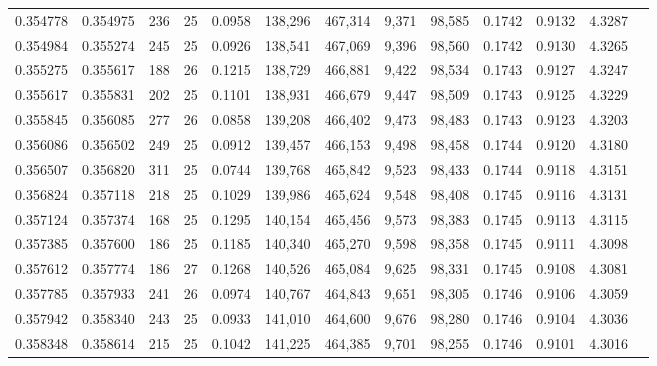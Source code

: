 \begin{tabular}{rrrrrrrrrrrrr}
0.354778 & 0.354975 & 236 &  25 &                                     0.0958 & 138,296 & 467,314 &   9,371 &  98,585 & 0.1742 & 0.9132 & 4.3287 \\
0.354984 & 0.355274 & 245 &  25 &                                     0.0926 & 138,541 & 467,069 &   9,396 &  98,560 & 0.1742 & 0.9130 & 4.3265 \\
0.355275 & 0.355617 & 188 &  26 &                                     0.1215 & 138,729 & 466,881 &   9,422 &  98,534 & 0.1743 & 0.9127 & 4.3247 \\
0.355617 & 0.355831 & 202 &  25 &                                     0.1101 & 138,931 & 466,679 &   9,447 &  98,509 & 0.1743 & 0.9125 & 4.3229 \\
0.355845 & 0.356085 & 277 &  26 &                                     0.0858 & 139,208 & 466,402 &   9,473 &  98,483 & 0.1743 & 0.9123 & 4.3203 \\
0.356086 & 0.356502 & 249 &  25 &                                     0.0912 & 139,457 & 466,153 &   9,498 &  98,458 & 0.1744 & 0.9120 & 4.3180 \\
0.356507 & 0.356820 & 311 &  25 &                                     0.0744 & 139,768 & 465,842 &   9,523 &  98,433 & 0.1744 & 0.9118 & 4.3151 \\
0.356824 & 0.357118 & 218 &  25 &                                     0.1029 & 139,986 & 465,624 &   9,548 &  98,408 & 0.1745 & 0.9116 & 4.3131 \\
0.357124 & 0.357374 & 168 &  25 &                                     0.1295 & 140,154 & 465,456 &   9,573 &  98,383 & 0.1745 & 0.9113 & 4.3115 \\
0.357385 & 0.357600 & 186 &  25 &                                     0.1185 & 140,340 & 465,270 &   9,598 &  98,358 & 0.1745 & 0.9111 & 4.3098 \\
0.357612 & 0.357774 & 186 &  27 &                                     0.1268 & 140,526 & 465,084 &   9,625 &  98,331 & 0.1745 & 0.9108 & 4.3081 \\
0.357785 & 0.357933 & 241 &  26 &                                     0.0974 & 140,767 & 464,843 &   9,651 &  98,305 & 0.1746 & 0.9106 & 4.3059 \\
0.357942 & 0.358340 & 243 &  25 &                                     0.0933 & 141,010 & 464,600 &   9,676 &  98,280 & 0.1746 & 0.9104 & 4.3036 \\
0.358348 & 0.358614 & 215 &  25 &                                     0.1042 & 141,225 & 464,385 &   9,701 &  98,255 & 0.1746 & 0.9101 & 4.3016 \\

\end{tabular}
